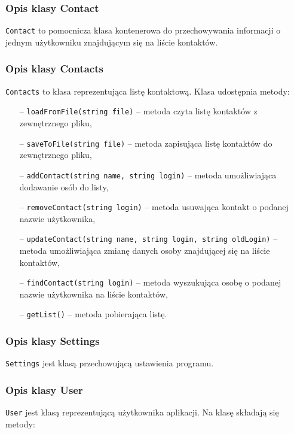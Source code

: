 \documentclass[a4paper,12pt]{article}
\begin{document}
\subsubsection[Opis klasy Contact]{Opis klasy Contact}
\texttt{Contact} to pomocnicza klasa kontenerowa do przechowywania informacji o jednym użytkowniku znajdującym się na liście kontaktów.

\subsubsection[Opis klasy Contacts]{Opis klasy Contacts}
\texttt{Contacts} to klasa reprezentująca listę kontaktową. Klasa udostępnia metody:

\begin{itemize}
    \item[--] \texttt{loadFromFile(string file)} -- metoda czyta listę kontaktów z zewnętrznego pliku,
    \item[--] \texttt{saveToFile(string file)} -- metoda zapisująca listę kontaktów do zewnętrznego pliku,
    \item[--] \texttt{addContact(string name, string login)} -- metoda umożliwiająca dodawanie osób do listy,
    \item[--] \texttt{removeContact(string login)} -- metoda usuwająca kontakt o podanej nazwie użytkownika,
    \item[--] \texttt{updateContact(string name, string login, string oldLogin)} -- metoda umożliwiająca zmianę danych osoby znajdującej się na liście kontaktów,
    \item[--] \texttt{findContact(string login)} -- metoda wyszukująca osobę o podanej nazwie użytkownika na liście kontaktów,
    \item[--] \texttt{getList()} -- metoda pobierająca listę.
\end{itemize} 

\subsubsection[Opis klasy Settings]{Opis klasy Settings}
\texttt{Settings} jest klasą przechowującą ustawienia programu.  

\subsubsection[Opis klasy User]{Opis klasy User}
\texttt{User} jest klasą reprezentującą użytkownika aplikacji. Na klasę składają się metody:
\end{document}
